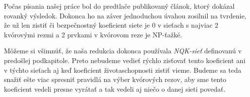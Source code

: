 \vspace{5mm}
Počas písania našej práce bol do predtlače publikovaný článok\cite{lachowski2019},
ktorý dokázal rovanký výsledok. Dokonca ho na záver jednoduchou úvahou zosilnil
na tvrdenie, že už len zistiť či bezpečnostný koeficient siete je 0
v sieťach s najviac 2 kvórovými rezmi a 2 prvkami v kvórovom reze je NP-ťažké.

Môžeme si všimnúť, že naša redukcia dokonca používala \textit{NQK-sieť} definovanú v predošlej
podkapitole. Preto nebudeme vedieť rýchlo zisťovať tento koeficient ani v týchto sieťach
aj keď koeficient životaschopnosti zistiť vieme.
Budeme sa teda snažiť ešte viac spresniť pravidlá na výber kvórových rezov,
aby sme tento koeficient vedeli presne vyrátať a tak vedeli aj niečo o danej sieti povedať.